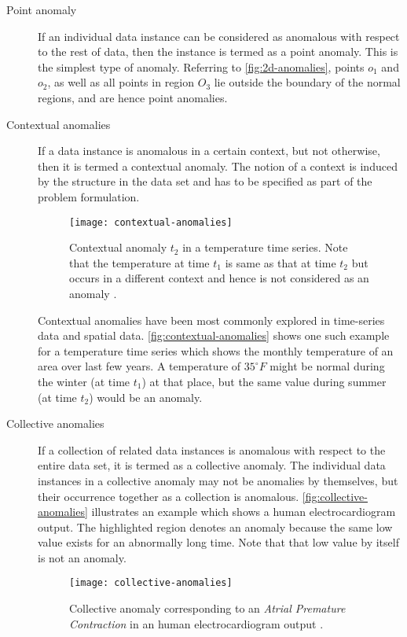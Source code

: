 \begin{description}

\item[Point anomaly] If an individual data instance can be considered as
anomalous with respect to the rest of data, then the instance is termed as a
point anomaly. This is the simplest type of anomaly. Referring to
\autoref{fig:2d-anomalies}, points $o_{1}$ and $o_{2}$, as well as all points in
region $O_{3}$ lie outside the boundary of the normal regions, and are hence
point anomalies.

\item[Contextual anomalies] If a data instance is anomalous in a certain
context, but not otherwise, then it is termed a contextual anomaly. The notion
of a context is induced by the structure in the data set and has to be specified
as part of the problem formulation.

\begin{figure}
    \centering
    \texttt{[image: contextual-anomalies]}
    \caption[Contextual anomaly $t_{2}$ in a temperature time series.]
        {Contextual anomaly $t_{2}$ in a temperature time series. Note that the
        temperature at time $t_{1}$ is same as that at time $t_{2}$ but occurs
        in a different context and hence is not considered as an anomaly
        \cite{Chandola:2007}.}
    \label{fig:contextual-anomalies}
\end{figure}

Contextual anomalies have been most commonly explored in time-series data and
spatial data. \autoref{fig:contextual-anomalies} shows one such example for a
temperature time series which shows the monthly temperature of an area over last
few years. A temperature of $35^\circ F$ might be normal during the winter
(at time $t_{1}$) at that place, but the same value during summer (at time
$t_{2}$) would be an anomaly.

\item[Collective anomalies] If a collection of related data instances is
anomalous with respect to the entire data set, it is termed as a collective
anomaly. The individual data instances in a collective anomaly may not be
anomalies by themselves, but their occurrence together as a collection is
anomalous. \autoref{fig:collective-anomalies} illustrates an example which shows
a human electrocardiogram output. The highlighted region denotes an anomaly
because the same low value exists for an abnormally long time. Note that that
low value by itself is not an anomaly.

\begin{figure}
    \centering
    \texttt{[image: collective-anomalies]}
    \caption[Collective anomaly corresponding to an \emph{Atrial Premature
        Contraction} in an human electrocardiogram output.]
        {Collective anomaly corresponding to an \emph{Atrial Premature
        Contraction} in an human electrocardiogram output 
        \cite{Goldberger:2000}.}
    \label{fig:collective-anomalies}
\end{figure}

\end{description}

